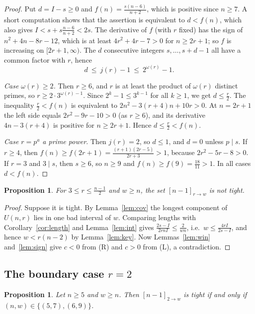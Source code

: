 \documentclass[11pt]{article}
\newtheorem{proposition}[theorem]{Proposition}
\theoremstyle{definition}
\begin{document}
\begin{proof}
Put $d=I-s\ge0$ and $f(n)=\frac{s(n-6)}{n+2}$, which is positive since
$n\ge7$. A short computation shows that the assertion is equivalent to
$d<f(n)$, which also gives $I<s+s\frac{n-6}{n+2}<2s$. The derivative of
$f$ (with $r$ fixed) has the sign of $n^2+4n-8r-12$, which is at least
$4r^2+4r-7>0$ for $n\ge2r+1$; so $f$ is increasing on $[2r+1,\infty)$.
The $d$ consecutive integers $s,\dots,s+d-1$ all have a common factor
with $r$, hence
\[
d\ \le\ j(r)-1\ \le\ 2^{\omega(r)}-1 .
\]

\emph{Case $\omega(r)\ge2$.} Then $r\ge6$, and $r$ is at least the
product of $\omega(r)$ distinct primes, so $r\ge2\cdot3^{\omega(r)-1}$.
Since $2^k-1\le3^{k-1}$ for all $k\ge1$, we get $d\le\frac r2$. The
inequality $\frac r2<f(n)$ is equivalent to
$2n^2-3(r+4)n+10r>0$. At $n=2r+1$ the left side equals
$2r^2-9r-10>0$ (as $r\ge6$), and its derivative $4n-3(r+4)$ is positive
for $n\ge2r+1$. Hence $d\le\frac r2<f(n)$.

\emph{Case $r=p^a$ a prime power.} Then $j(r)=2$, so $d\le1$, and
$d=0$ unless $p\mid s$. If $r\ge4$, then
$f(n)\ge f(2r+1)=\frac{(r+1)(2r-5)}{2r+3}>1$, because $2r^2-5r-8>0$. If
$r=3$ and $3\mid s$, then $s\ge6$, so $n\ge9$ and
$f(n)\ge f(9)=\frac{18}{11}>1$. In all cases $d<f(n)$.
\end{proof}

\begin{proposition}\label{prop:mid}
For $3\le r\le\frac{n-1}2$ and $w\ge n$, the set $[n-1]_{r\to w}$ is
not tight.
\end{proposition}

\begin{proof}
Suppose it is tight. By Lemma~\ref{lem:cov} the longest component of
$U(n,r)$ lies in one bad interval of $w$. Comparing lengths with
Corollary~\ref{cor:length} and Lemma~\ref{lem:int} gives
$\frac{2s-I}{2rnI}\le\frac2{wn}$, i.e.\ $w\le\frac{4rI}{2s-I}$, and
hence $w<r(n-2)$ by Lemma~\ref{lem:key}. Now Lemmas~\ref{lem:win}
and~\ref{lem:sign} give $c<0$ from (R) and $c>0$ from (L), a
contradiction.
\end{proof}

\subsection{\texorpdfstring{The boundary case $r=2$}{The boundary case r=2}}

\begin{proposition}\label{prop:r2}
Let $n\ge5$ and $w\ge n$. Then $[n-1]_{2\to w}$ is tight if and only if
$(n,w)\in\{(5,7),(6,9)\}$.
\end{proposition}
\end{document}
